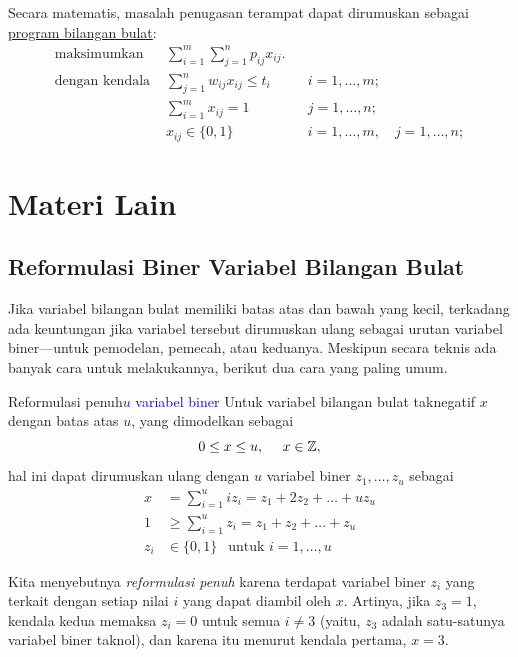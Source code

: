 Secara matematis, masalah penugasan terampat dapat dirumuskan sebagai
\href{Integer_programming}{program bilangan bulat}:
\begin{align} \text{maksimumkan } &
\sum_{i=1}^m\sum_{j=1}^n
p_{ij} x_{ij}. \\
\text{dengan kendala } & \sum_{j=1}^n
w_{ij} x_{ij} \le t_i & & i=1,
\ldots, m; \\ &
\sum_{i=1}^m x_{ij} = 1 & & j=1,
\ldots, n; \\ & x_{ij}
\in \{0,1\} & & i=1,
\ldots, m, \quad j=1,
\ldots, n; \end{align}

\section{Materi Lain}

\subsection{Reformulasi Biner Variabel Bilangan Bulat}
Jika variabel bilangan bulat memiliki batas atas dan bawah yang kecil, terkadang ada keuntungan jika variabel tersebut dirumuskan ulang sebagai urutan variabel biner---untuk pemodelan, pemecah, atau keduanya. Meskipun secara teknis ada banyak cara untuk melakukannya, berikut dua cara yang paling umum.

\begin{general}{Reformulasi penuh}{\textcolor{blue}{$u$ variabel biner}}
\label{general:full-reformulation}
Untuk variabel bilangan bulat taknegatif $x$ dengan batas atas $u$, yang dimodelkan sebagai
\begin{equation}
0 \leq x \leq u, \ \ \ \ x \in \Z,
\end{equation}
hal ini dapat dirumuskan ulang dengan $u$ variabel biner $z_1, \dots, z_u$ sebagai
\begin{equation}
\begin{split}
x & = \sum_{i=1}^u i z_i = z_1 + 2 z_2 + \dots + u z_u\\
1 & \geq \sum_{i=1}^u z_i = z_1 + z_2 + \dots + z_u\\
z_i & \in \{0,1\} \ \ \text{ untuk } i=1, \dots, u
\end{split}
\end{equation}
\end{general}
Kita menyebutnya \emph{reformulasi penuh} karena terdapat variabel biner $z_i$ yang terkait dengan setiap nilai $i$ yang dapat diambil oleh $x$. Artinya, jika $z_3 = 1$, kendala kedua memaksa $z_i = 0$ untuk semua $i \neq 3$ (yaitu, $z_3$ adalah satu-satunya variabel biner taknol), dan karena itu menurut kendala pertama, $x = 3$.

